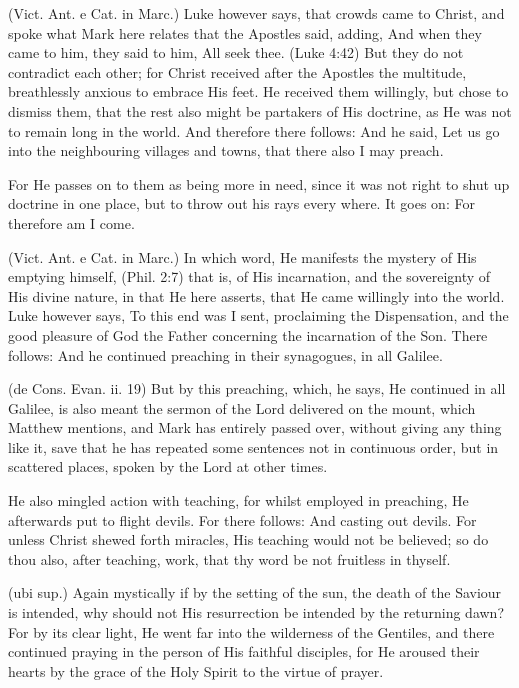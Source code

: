  (Vict. Ant. e Cat. in Marc.) Luke however says, that crowds came to Christ, and spoke what Mark here relates that the Apostles said, adding, And when they came to him, they said to him, All seek thee. (Luke 4:42) But they do not contradict each other; for Christ received after the Apostles the multitude, breathlessly anxious to embrace His feet. He received them willingly, but chose to dismiss them, that the rest also might be partakers of His doctrine, as He was not to remain long in the world. And therefore there follows: And he said, Let us go into the neighbouring villages and towns, that there also I may preach.

 For He passes on to them as being more in need, since it was not right to shut up doctrine in one place, but to throw out his rays every where. It goes on: For therefore am I come.

 (Vict. Ant. e Cat. in Marc.) In which word, He manifests the mystery of His emptying himself, (Phil. 2:7) that is, of His incarnation, and the sovereignty of His divine nature, in that He here asserts, that He came willingly into the world. Luke however says, To this end was I sent, proclaiming the Dispensation, and the good pleasure of God the Father concerning the incarnation of the Son. There follows: And he continued preaching in their synagogues, in all Galilee.

 (de Cons. Evan. ii. 19) But by this preaching, which, he says, He continued in all Galilee, is also meant the sermon of the Lord delivered on the mount, which Matthew mentions, and Mark has entirely passed over, without giving any thing like it, save that he has repeated some sentences not in continuous order, but in scattered places, spoken by the Lord at other times.

 He also mingled action with teaching, for whilst employed in preaching, He afterwards put to flight devils. For there follows: And casting out devils. For unless Christ shewed forth miracles, His teaching would not be believed; so do thou also, after teaching, work, that thy word be not fruitless in thyself.

 (ubi sup.) Again mystically if by the setting of the sun, the death of the Saviour is intended, why should not His resurrection be intended by the returning dawn? For by its clear light, He went far into the wilderness of the Gentiles, and there continued praying in the person of His faithful disciples, for He aroused their hearts by the grace of the Holy Spirit to the virtue of prayer.

